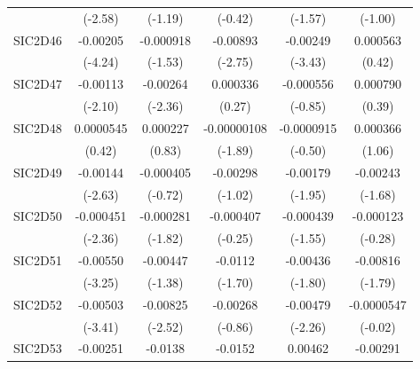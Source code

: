 \begin{table}[htbp]
\begin{tabular}{l*{5}{c}}
            &     (-2.58)         &     (-1.19)         &     (-0.42)         &     (-1.57)         &     (-1.00)         \\
SIC2D46     &    -0.00205\sym{***}&   -0.000918         &    -0.00893\sym{**} &    -0.00249\sym{***}&    0.000563         \\
            &     (-4.24)         &     (-1.53)         &     (-2.75)         &     (-3.43)         &      (0.42)         \\
SIC2D47     &    -0.00113\sym{*}  &    -0.00264\sym{*}  &    0.000336         &   -0.000556         &    0.000790         \\
            &     (-2.10)         &     (-2.36)         &      (0.27)         &     (-0.85)         &      (0.39)         \\
SIC2D48     &   0.0000545         &    0.000227         & -0.00000108         &  -0.0000915         &    0.000366         \\
            &      (0.42)         &      (0.83)         &     (-1.89)         &     (-0.50)         &      (1.06)         \\
SIC2D49     &    -0.00144\sym{**} &   -0.000405         &    -0.00298         &    -0.00179         &    -0.00243         \\
            &     (-2.63)         &     (-0.72)         &     (-1.02)         &     (-1.95)         &     (-1.68)         \\
SIC2D50     &   -0.000451\sym{*}  &   -0.000281         &   -0.000407         &   -0.000439         &   -0.000123         \\
            &     (-2.36)         &     (-1.82)         &     (-0.25)         &     (-1.55)         &     (-0.28)         \\
SIC2D51     &    -0.00550\sym{**} &    -0.00447         &     -0.0112         &    -0.00436         &    -0.00816         \\
            &     (-3.25)         &     (-1.38)         &     (-1.70)         &     (-1.80)         &     (-1.79)         \\
SIC2D52     &    -0.00503\sym{***}&    -0.00825\sym{*}  &    -0.00268         &    -0.00479\sym{*}  &  -0.0000547         \\
            &     (-3.41)         &     (-2.52)         &     (-0.86)         &     (-2.26)         &     (-0.02)         \\
SIC2D53     &    -0.00251         &     -0.0138\sym{**} &     -0.0152\sym{*}  &     0.00462         &    -0.00291         \\

\end{tabular}
\end{table}
